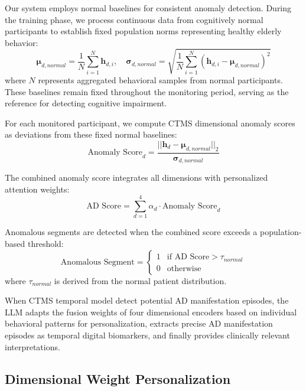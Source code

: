 \documentclass[sigconf, anonymous, 9pt, nonacm]{acmart}
\begin{document}
Our system employs normal baselines for consistent anomaly detection. During the training phase, we process continuous data from cognitively normal participants to establish fixed population norms representing healthy elderly behavior:
\begin{equation*}
\boldsymbol{\mu}_{d,normal} = \frac{1}{N}\sum_{i=1}^{N}\mathbf{h}_{d,i}, \quad \boldsymbol{\sigma}_{d,normal} = \sqrt{\frac{1}{N}\sum_{i=1}^{N}(\mathbf{h}_{d,i} - \boldsymbol{\mu}_{d,normal})^2}
\end{equation*}
where $N$ represents aggregated behavioral samples from normal participants. These baselines remain fixed throughout the monitoring period, serving as the reference for detecting cognitive impairment.

For each monitored participant, we compute CTMS dimensional anomaly scores as deviations from these fixed normal baselines:
\begin{equation*}
\text{Anomaly Score}_d = \frac{||\mathbf{h}_d - \boldsymbol{\mu}_{d,normal}||_2}{\boldsymbol{\sigma}_{d,normal}}
\end{equation*}

The combined anomaly score integrates all dimensions with personalized attention weights:
\begin{equation*}
\text{AD Score} = \sum_{d=1}^{4} \alpha_d \cdot \text{Anomaly Score}_d
\end{equation*}

Anomalous segments are detected when the combined score exceeds a population-based threshold:
\begin{equation*}
\text{Anomalous Segment} = \begin{cases}
1 & \text{if AD Score} > \tau_{normal} \\
0 & \text{otherwise}
\end{cases}
\end{equation*}
where $\tau_{normal}$ is derived from the normal patient distribution.

When CTMS temporal model detect potential AD manifestation episodes, the LLM adapts the fusion weights of four dimensional encoders based on individual behavioral patterns for personalization, extracts precise AD manifestation episodes as temporal digital biomarkers, and finally provides clinically relevant interpretations.



\subsection{Dimensional Weight Personalization}
\end{document}
